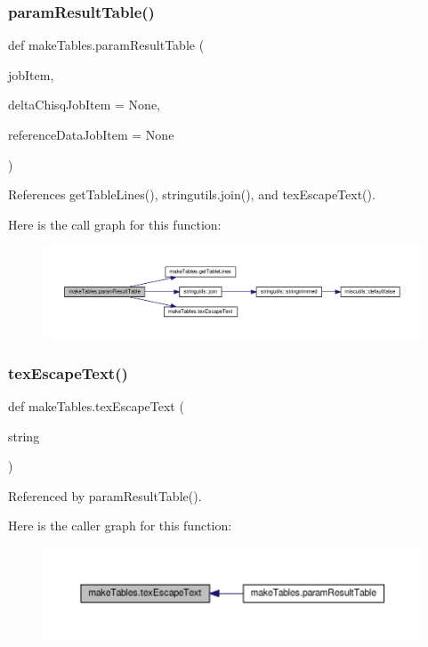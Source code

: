 \subsubsection{\texorpdfstring{param\+Result\+Table()}{paramResultTable()}}
{\footnotesize\ttfamily def make\+Tables.\+param\+Result\+Table (\begin{DoxyParamCaption}\item[{}]{job\+Item,  }\item[{}]{delta\+Chisq\+Job\+Item = {\ttfamily None},  }\item[{}]{reference\+Data\+Job\+Item = {\ttfamily None} }\end{DoxyParamCaption})}



References get\+Table\+Lines(), stringutils.\+join(), and tex\+Escape\+Text().

Here is the call graph for this function\+:
\nopagebreak
\begin{figure}[H]
\begin{center}
\leavevmode
\includegraphics[width=350pt]{namespacemakeTables_a05676f114347275725afdc58dc3656ff_cgraph}
\end{center}
\end{figure}
\mbox{\label{namespacemakeTables_abbf7a84c8c93f8d3f0e1b93072989766}} 
\subsubsection{\texorpdfstring{tex\+Escape\+Text()}{texEscapeText()}}
{\footnotesize\ttfamily def make\+Tables.\+tex\+Escape\+Text (\begin{DoxyParamCaption}\item[{}]{string }\end{DoxyParamCaption})}



Referenced by param\+Result\+Table().

Here is the caller graph for this function\+:
\nopagebreak
\begin{figure}[H]
\begin{center}
\leavevmode
\includegraphics[width=350pt]{namespacemakeTables_abbf7a84c8c93f8d3f0e1b93072989766_icgraph}
\end{center}
\end{figure}


